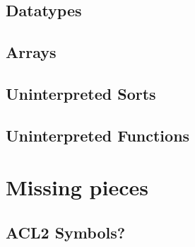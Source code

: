 
\subsection{Datatypes}

\subsection{Arrays}

\subsection{Uninterpreted Sorts}

\subsection{Uninterpreted Functions}


\section{Missing pieces}

\subsection{ACL2 Symbols?}

